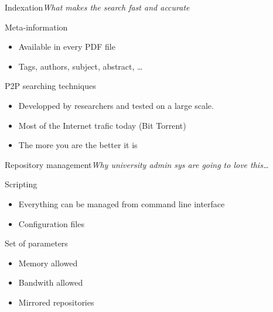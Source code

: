 

\begin{frame}{Indexation}{\textit{What makes the search fast and accurate}}

\begin{block}{Meta-information}
\begin{itemize}
\item Available in every PDF file
\item Tags, authors, subject, abstract, \ldots
\end{itemize}
\end{block}

\begin{block}{P2P searching techniques}
\begin{itemize}
\item Developped by researchers and tested on a large scale.
\item Most of the Internet trafic today (Bit Torrent)
\item The more you are the better it is
\end{itemize}
\end{block}

\end{frame}


\begin{frame}{Repository management}{\textit{Why university admin sys are going to love this\ldots}}

\begin{block}{Scripting}
\begin{itemize}
\item Everything can be managed from command line interface
\item Configuration files
\end{itemize}
\end{block}

\begin{block}{Set of parameters}
\begin{itemize}
\item Memory allowed
\item Bandwith allowed
\item Mirrored repositories
\end{itemize}
\end{block}

\end{frame}


